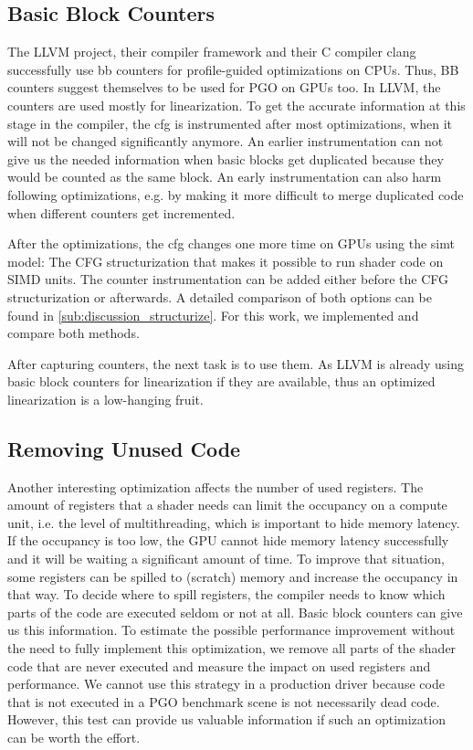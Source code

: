 \subsection{Basic Block Counters}
\label{sub:design_counters}
The LLVM project, their compiler framework and their C compiler clang successfully use \gls{bb} counters for profile-guided optimizations on CPUs. Thus, BB counters suggest themselves to be used for PGO on GPUs too.
In LLVM, the counters are used mostly for linearization. To get the accurate information at this stage in the compiler, the \gls{cfg} is instrumented after most optimizations, when it will not be changed significantly anymore.
An earlier instrumentation can not give us the needed information when basic blocks get duplicated because they would be counted as the same block.
An early instrumentation can also harm following optimizations, e.g. by making it more difficult to merge duplicated code when different counters get incremented.

After the optimizations, the \gls{cfg} changes one more time on GPUs using the \gls{simt} model: The CFG structurization that makes it possible to run shader code on SIMD units.
The counter instrumentation can be added either before the CFG structurization or afterwards.
A detailed comparison of both options can be found in \cref{sub:discussion_structurize}. For this work, we implemented and compare both methods.

After capturing counters, the next task is to use them. As LLVM is already using basic block counters for linearization if they are available, thus an optimized linearization is a low-hanging fruit.

\subsection{Removing Unused Code}
\label{sub:design_unused}
Another interesting optimization affects the number of used registers.
The amount of registers that a shader needs can limit the occupancy on a compute unit, i.e. the level of multithreading, which is important to hide memory latency.
If the occupancy is too low, the GPU cannot hide memory latency successfully and it will be waiting a significant amount of time.
To improve that situation, some registers can be spilled to (scratch) memory and increase the occupancy in that way.
To decide where to spill registers, the compiler needs to know which parts of the code are executed seldom or not at all.
Basic block counters can give us this information.
To estimate the possible performance improvement without the need to fully implement this optimization, we remove all parts of the shader code that are never executed and measure the impact on used registers and performance.
We cannot use this strategy in a production driver because code that is not executed in a PGO benchmark scene is not necessarily dead code.
However, this test can provide us valuable information if such an optimization can be worth the effort.

